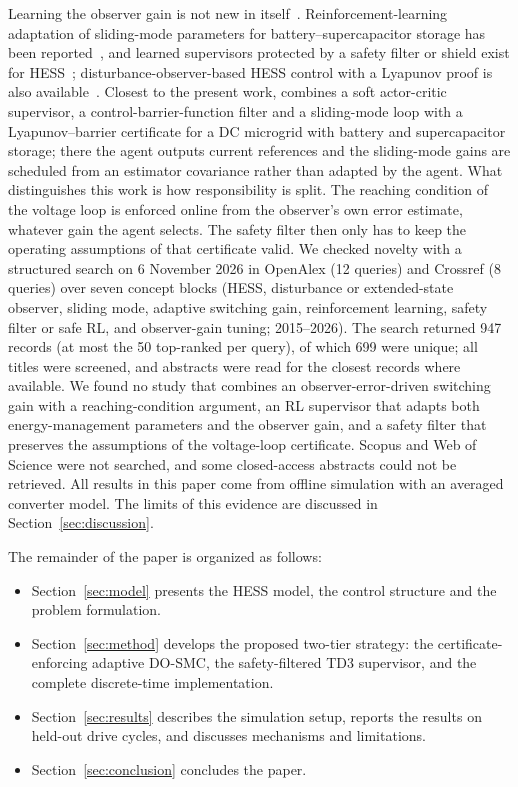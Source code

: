 Learning the observer gain is not new in itself~\cite{choi2024dob,luna2026}. Reinforcement-learning adaptation of sliding-mode parameters for battery--supercapacitor storage has been reported~\cite{ghias2026rlsmc,yang2027sac}, and learned supervisors protected by a safety filter or shield exist for HESS~\cite{xu2025safe,zhang2026shield}; disturbance-observer-based HESS control with a Lyapunov proof is also available~\cite{song2025etac}. Closest to the present work, \cite{jouili2026cbf} combines a soft actor-critic supervisor, a control-barrier-function filter and a sliding-mode loop with a Lyapunov--barrier certificate for a DC microgrid with battery and supercapacitor storage; there the agent outputs current references and the sliding-mode gains are scheduled from an estimator covariance rather than adapted by the agent. What distinguishes this work is how responsibility is split. The reaching condition of the voltage loop is enforced online from the observer's own error estimate, whatever gain the agent selects. The safety filter then only has to keep the operating assumptions of that certificate valid. We checked novelty with a structured search on 6 November 2026 in OpenAlex (12 queries) and Crossref (8 queries) over seven concept blocks (HESS, disturbance or extended-state observer, sliding mode, adaptive switching gain, reinforcement learning, safety filter or safe RL, and observer-gain tuning; 2015--2026). The search returned 947 records (at most the 50 top-ranked per query), of which 699 were unique; all titles were screened, and abstracts were read for the closest records where available. We found no study that combines an observer-error-driven switching gain with a reaching-condition argument, an RL supervisor that adapts both energy-management parameters and the observer gain, and a safety filter that preserves the assumptions of the voltage-loop certificate. Scopus and Web of Science were not searched, and some closed-access abstracts could not be retrieved. All results in this paper come from offline simulation with an averaged converter model. The limits of this evidence are discussed in Section~\ref{sec:discussion}.

The remainder of the paper is organized as follows:
\begin{itemize}
\item Section~\ref{sec:model} presents the HESS model, the control structure and the problem formulation.
\item Section~\ref{sec:method} develops the proposed two-tier strategy: the certificate-enforcing adaptive DO-SMC, the safety-filtered TD3 supervisor, and the complete discrete-time implementation.
\item Section~\ref{sec:results} describes the simulation setup, reports the results on held-out drive cycles, and discusses mechanisms and limitations.
\item Section~\ref{sec:conclusion} concludes the paper.
\end{itemize}
